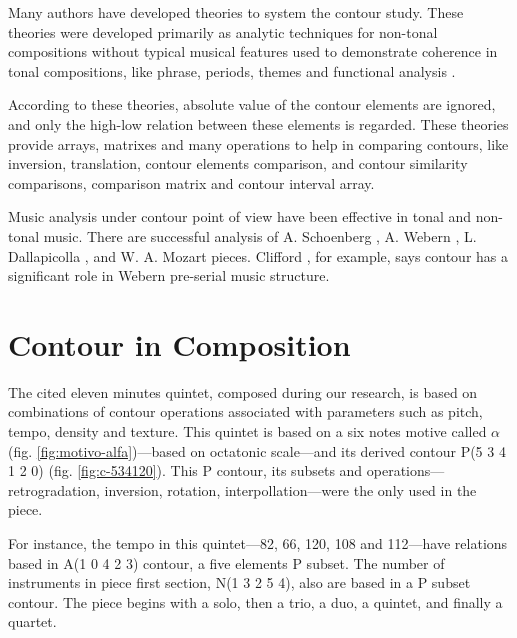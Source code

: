 Many authors
\cite{friedmann85:methodology,friedmann87:response,morris87:composition,morris93:directions,marvin.ea87:relating,marvin88:generalized,marvin.ea95:generalization,polansky.ea92:possible,quinn97:fuzzy,clifford95:contour,beard03:contour}
have developed theories to system the contour study. These theories
were developed primarily as analytic techniques for non-tonal
compositions without typical musical features used to demonstrate
coherence in tonal compositions, like phrase, periods, themes and
functional analysis \cite{beard03:contour}.

According to these theories, absolute value of the contour elements
are ignored, and only the high-low relation between these elements is
regarded.  These theories provide arrays, matrixes and many operations
to help in comparing contours, like inversion, translation, contour
elements comparison, and contour similarity comparisons, comparison
matrix and contour interval array.

Music analysis under contour point of view have been effective in
tonal and non-tonal music. There are successful analysis of A.
Schoenberg \cite{friedmann85:methodology}, A. Webern
\cite{clifford95:contour}, L. Dallapicolla
\cite{marvin88:generalized}, and W. A. Mozart \cite{beard03:contour}
pieces. Clifford \cite{clifford95:contour}, for example, says contour
has a significant role in Webern pre-serial music structure.

\section{Contour in Composition}
\label{sec:contour-composition}

The cited eleven minutes quintet, composed during our research, is
based on combinations of contour operations associated with parameters
such as pitch, tempo, density and texture. This quintet is based on a
six notes motive called $\alpha$ (fig. \ref{fig:motivo-alfa})---based
on octatonic scale---and its derived contour P(5 3 4 1 2 0)
(fig. \ref{fig:c-534120}). This P contour, its subsets and
operations---retrogradation, inversion, rotation,
interpollation---were the only used in the piece.

For instance, the tempo in this quintet---82, 66, 120, 108 and
112---have relations based in A(1 0 4 2 3) contour, a five elements P
subset. The number of instruments in piece first section, N(1 3 2 5
4), also are based in a P subset contour. The piece begins with a
solo, then a trio, a duo, a quintet, and finally a quartet.

